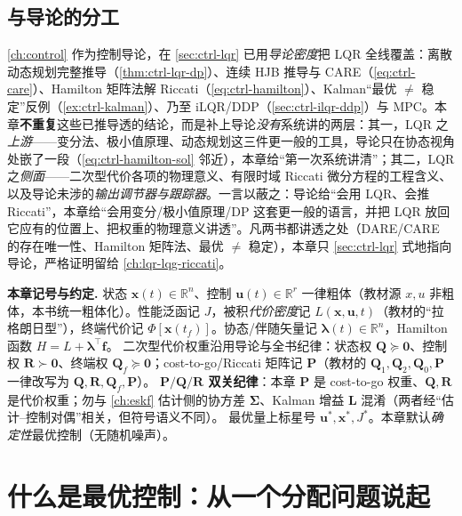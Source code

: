 \subsection*{与导论的分工}
\cref{ch:control} 作为控制导论，在 \cref{sec:ctrl-lqr} 已用\emph{导论密度}把 LQR 全线覆盖：离散动态规划完整推导（\cref{thm:ctrl-lqr-dp}）、连续 HJB 推导与 CARE（\cref{eq:ctrl-care}）、Hamilton 矩阵法解 Riccati（\cref{eq:ctrl-hamilton}）、Kalman“最优 $\ne$ 稳定”反例（\cref{ex:ctrl-kalman}）、乃至 iLQR/DDP（\cref{sec:ctrl-ilqr-ddp}）与 MPC。本章\textbf{不重复}这些已推导透的结论，而是补上导论\emph{没有}系统讲的两层：其一，LQR 之\emph{上游}——变分法、极小值原理、动态规划这三件更一般的工具，导论只在协态视角处嵌了一段（\cref{eq:ctrl-hamilton-sol} 邻近），本章给“第一次系统讲清”；其二，LQR 之\emph{侧面}——二次型代价各项的物理意义、有限时域 Riccati 微分方程的工程含义、以及导论未涉的\emph{输出调节器与跟踪器}。一言以蔽之：导论给“会用 LQR、会推 Riccati”，本章给“会用变分/极小值原理/DP 这套更一般的语言，并把 LQR 放回它应有的位置上、把权重的物理意义讲透”。凡两书都讲透之处（DARE/CARE 的存在唯一性、Hamilton 矩阵法、最优 $\ne$ 稳定），本章只 \cref{sec:ctrl-lqr} 式地指向导论，严格证明留给 \cref{ch:lqr-lqg-riccati}。

\begin{note}
\textbf{本章记号与约定.}\;
状态 $\mathbf{x}(t)\in\mathbb{R}^n$、控制 $\mathbf{u}(t)\in\mathbb{R}^r$ 一律粗体（教材源 $x,u$ 非粗体，本书统一粗体化）。性能泛函记 $J$，被积\emph{代价密度}记 $L(\mathbf{x},\mathbf{u},t)$（教材的“拉格朗日型”），终端代价记 $\Phi[\mathbf{x}(t_f)]$。协态/伴随矢量记 $\boldsymbol\lambda(t)\in\mathbb{R}^n$，Hamilton 函数 $H=L+\boldsymbol\lambda^\top\mathbf{f}$。
二次型代价权重沿用导论与全书纪律：状态权 $\mathbf{Q}\succeq\mathbf{0}$、控制权 $\mathbf{R}\succ\mathbf{0}$、终端权 $\mathbf{Q}_f\succeq\mathbf{0}$；cost-to-go/Riccati 矩阵记 $\mathbf{P}$（教材的 $\mathbf{Q}_1,\mathbf{Q}_2,\mathbf{Q}_0,\mathbf{P}$ 一律改写为 $\mathbf{Q},\mathbf{R},\mathbf{Q}_f,\mathbf{P}$）。
\textbf{$\mathbf{P}/\mathbf{Q}/\mathbf{R}$ 双关纪律}：本章 $\mathbf{P}$ 是 cost-to-go 权重、$\mathbf{Q},\mathbf{R}$ 是代价权重；勿与 \cref{ch:eskf} 估计侧的协方差 $\boldsymbol\Sigma$、Kalman 增益 $\mathbf{L}$ 混淆（两者经“估计--控制对偶”相关，但符号语义不同）。
最优量上标星号 $\mathbf{u}^*,\mathbf{x}^*,J^*$。本章默认\emph{确定性}最优控制（无随机噪声）。
\end{note}

\section{什么是最优控制：从一个分配问题说起}
\label{sec:oc-overview}

